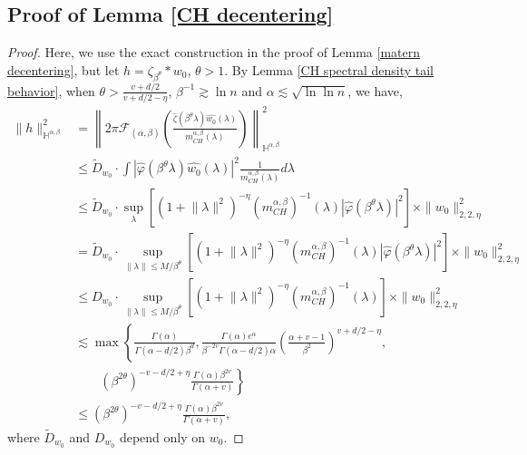 \documentclass[ejs,noshowframe]{imsart}
\theoremstyle{plain}
\theoremstyle{definition}
\theoremstyle{remark}
\begin{document}
\begin{appendix}
\subsection{Proof of Lemma \ref{CH decentering}}
\begin{proof}
Here,  we use the exact construction in the proof of Lemma \ref{matern decentering}, but let $h=\zeta_{\beta^{\theta}}* w_0$, $\theta>1$.
By Lemma \ref{CH spectral density tail behavior}, when
$\theta > \frac{v+d/2}{v+d/2-\eta}$, $\beta^{-1} \gtrsim \ln n$ and $\alpha \lesssim \sqrt{\ln \ln n}$,  we have,
\begin{equation}
\begin{split}
\|h\|_\mathbb{H^{\alpha,\beta}}^2 &= \left\| 2 \pi \mathcal{F}_{(\alpha,\beta)}\left( \frac{\hat{\zeta}(\beta^{\theta} \lambda)\hat{w_0}(\lambda)}{m_{CH}^{\alpha,\beta}(\lambda)}\right)\right\|_\mathbb{H^{\alpha,\beta}}^2 \\
& \leq  \tilde{D}_{w_0} \cdot \int|\hat{\varphi}(\beta^{\theta} \lambda)\hat{w_0}(\lambda)|^2 \frac{1}{{m_{CH}^{\alpha,\beta}}(\lambda)} d\lambda \\ 
&\leq  \tilde{D}_{w_0} \cdot  \sup_\lambda[(1+{\|\lambda\|^2})^{-\eta} ({m_{CH}^{\alpha,\beta}})^{-1}(\lambda) |\hat{\varphi}(\beta^{\theta} \lambda)|^2] \times \|w_0\|^2_{2,2,\eta}\\
& =  \tilde{D}_{w_0} \cdot \sup_{\|\lambda\| \leq M/\beta^{\theta}}[(1+{\|\lambda\|^2})^{-\eta}({m_{CH}^{\alpha,\beta}})^{-1}(\lambda) |\hat{\varphi}(\beta^{\theta}\lambda)|^2] \times \|w_0\|^2_{2,2,\eta}\\
&\leq  {D}_{w_0} \cdot \sup_{\|\lambda\| \leq M/\beta^{\theta}}[(1+{\|\lambda\|^2})^{-\eta}({m_{CH}^{\alpha,\beta}})^{-1}(\lambda) ] \times \|w_0\|^2_{2,2,\eta}\\
&\lesssim  \max \left\{\frac{\Gamma(\alpha)}{\Gamma(\alpha-d/2)\beta^d}, \frac{\Gamma(\alpha) e^\alpha}{\beta^{-2v}\Gamma(\alpha-d/2)\alpha}\left(\frac{\alpha+v-1}{\beta^2}\right)^{v+d/2-\eta},\right.\\
&\left.\qquad(\beta^{2\theta})^{-v-d/2+\eta} \frac{\Gamma(\alpha) \beta^{2v}}{\Gamma(\alpha+v)}\right\}                                         \\
&\leq  (\beta^{2\theta})^{-v-d/2+\eta} \frac{\Gamma(\alpha) \beta^{2v}}{\Gamma(\alpha+v)},
\end{split}
\end{equation}
where $\tilde{D}_{w_0}$ and ${D}_{w_0}$ depend only on $w_0$. 
\end{proof}


\end{appendix}
\end{document}
